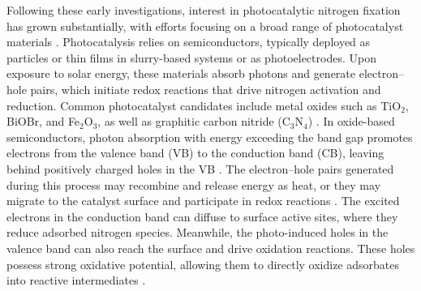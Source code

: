 Following these early investigations, interest in photocatalytic nitrogen fixation has grown substantially, with efforts focusing on a broad range of photocatalyst materials \cite{Medford_2017, Hirakawa_2017, cao2019photocatalytic, hu2016effect, zhao2019tuning, jia2019site, cheng2019photocatalytic, Zhang2020NanostructuredFixation, comer2018role, Hao2020CatalyticProspects, Nazemi2019Plasmon-enhancedNanocages, Chang2020AuAmmonia}. Photocatalysis relies on semiconductors, typically deployed as particles or thin films in slurry-based systems or as photoelectrodes. Upon exposure to solar energy, these materials absorb photons and generate electron–hole pairs, which initiate redox reactions that drive nitrogen activation and reduction. Common photocatalyst candidates include metal oxides such as TiO$_2$, BiOBr, and Fe$_2$O$_3$, as well as graphitic carbon nitride (C$_3$N$_4$) \cite{Liang2020InsightDopant, hirakawa2017photocatalytic}. In oxide-based semiconductors, photon absorption with energy exceeding the band gap promotes electrons from the valence band (VB) to the conduction band (CB), leaving behind positively charged holes in the VB \cite{Sadeghfar2021ChapterMedia}. The electron–hole pairs generated during this process may recombine and release energy as heat, or they may migrate to the catalyst surface and participate in redox reactions \cite{Gaya2013HeterogeneousSolids}. The excited electrons in the conduction band can diffuse to surface active sites, where they reduce adsorbed nitrogen species. Meanwhile, the photo-induced holes in the valence band can also reach the surface and drive oxidation reactions. These holes possess strong oxidative potential, allowing them to directly oxidize adsorbates into reactive intermediates \cite{Lee2016RecentReview}. 

